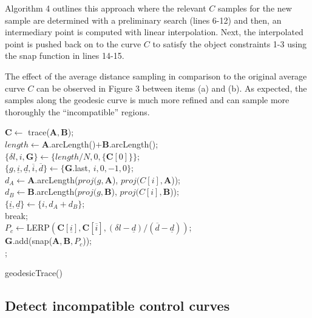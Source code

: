 \documentclass[journal, letterpaper]{IEEEtran}
\begin{document}
Algorithm 4 outlines this approach where the relevant $C$ samples for the new sample are
determined with a preliminary search (lines 6-12) and then, an intermediary point is computed
with linear interpolation. Next, the interpolated point is pushed back on to the curve $C$
to satisfy the object constraints 1-3 using the snap function in lines 14-15.

The effect of the average distance sampling in comparison to the original average curve
$C$ can be observed in Figure 3 between items (a) and (b). As expected, the samples
along the geodesic curve is much more refined and can sample more thoroughly the ``incompatible''
regions.

\begin{algorithm}[ht!]
  $\mathbf{C} \leftarrow$ trace($\mathbf{A}, \mathbf{B}$); \\
  $length \leftarrow \mathbf{A}.$arcLength()$ + \mathbf{B}.$arcLength(); \\
  $\{\delta l, i, \mathbf{G}\} \leftarrow \{length / N, 0, \{\mathbf{C}[0]\}\}$;\\
   {
    $\{g, \underline{i}, \underline{d}, \overline{i}, \overline{d}\} \leftarrow \{\mathbf{G}$.last, $i,0,-1,0\};$ \\
     {
      $d_A \leftarrow \mathbf{A}.$arcLength($proj(g,\mathbf{A}$), $proj(C[i], \mathbf{A}$)); \\
      $d_B \leftarrow \mathbf{B}.$arcLength($proj(g,\mathbf{B}$), $proj(C[i], \mathbf{B}$)); \\
       $\{\underline{i}, \underline{d}\} \leftarrow \{i, d_A + d_B\}$; \\
    }
     break; \\
    $P_c \leftarrow $LERP$(\mathbf{C}[\underline{i}], \mathbf{C}[\overline{i}], (\delta l - \underline{d}) / (\overline{d} - \underline{d}))$;\\
    $\mathbf{G}$.add(snap($\mathbf{A}, \mathbf{B}, P_c$)); \\
  }
  ;
  \caption{geodesicTrace()}
\end{algorithm}

\newpage
\subsection{Detect incompatible control curves}
\end{document}

